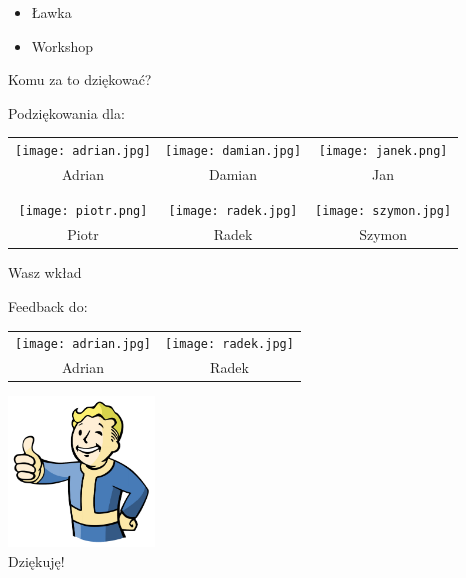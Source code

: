 \documentclass{beamer}
\begin{document}
\begin{frame}{}
	\begin{huge}
		\begin{itemize}
			\item Ławka
			\item Workshop
		\end{itemize}
	\end{huge}
\end{frame}

\begin{frame}{}
	\begin{center}
		\Huge{Komu za to dziękować?}
	\end{center}
\end{frame}

\begin{frame}{Podziękowania dla:}
	\begin{center}
		\begin{tabular}{ c c c }			
		 	\texttt{[image: adrian.jpg]} & \texttt{[image: damian.jpg]} & \texttt{[image: janek.png]} \\ 
			Adrian & Damian & Jan \\ \\ \\
		 	\texttt{[image: piotr.png]} & \texttt{[image: radek.jpg]} & \texttt{[image: szymon.jpg]} \\
			Piotr & Radek & Szymon
		\end{tabular}
	\end{center}
\end{frame}

\begin{frame}{}
	\begin{center}
		\Huge{Wasz wkład}
	\end{center}
\end{frame}

\begin{frame}{Feedback do:}
	\begin{center}
		\begin{tabular}{ c c }
			\\
		 	\texttt{[image: adrian.jpg]} & \texttt{[image: radek.jpg]} \\
			Adrian & Radek 
		\end{tabular}
	\end{center}
\end{frame}

\begin{frame}{}
	\begin{center}
  		\includegraphics[height=4cm]{ok.png} \\
		\Huge{Dziękuję!}
	\end{center}
\end{frame}
\end{document}
